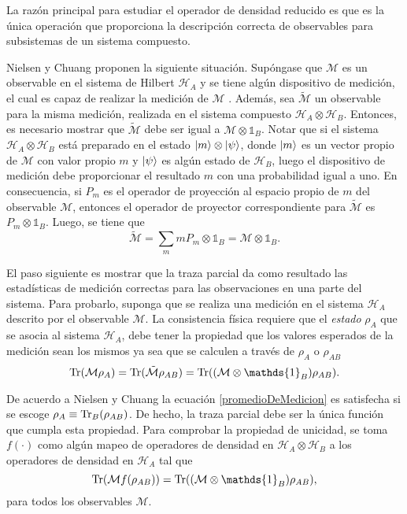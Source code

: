 La razón principal para estudiar el operador de densidad reducido es que es la única operación que proporciona la descripción correcta de observables para subsistemas de un sistema compuesto. 

Nielsen y Chuang {\cite{nielsen_chuang_2010}} proponen la siguiente situación. Supóngase que $\mathcal{M}$ es un observable en el sistema de Hilbert $\mathcal{H}_A$ y se tiene algún dispositivo de medición, el cual es capaz de realizar la medición de $\mathcal{M}$ . Además, sea $\tilde{\mathcal{M}}$ un observable para la
misma medición, realizada en el sistema compuesto $\mathcal{H}_A\otimes
\mathcal{H}_B$. Entonces, es necesario mostrar que $\tilde{\mathcal{M}}$ debe
ser igual a $\mathcal{M}\otimes \mathds{1}_B$. Notar que si el sistema
$\mathcal{H}_A\otimes \mathcal{H}_B$ está preparado en el estado $|m \rangle
\otimes|\psi\rangle $, donde $|m\rangle $ es un vector propio de $\mathcal{M}$ con
valor propio $m$ y $|\psi\rangle$ es algún estado de $\mathcal{H}_B$, luego el
dispositivo de medición debe proporcionar  el resultado $m$ con una probabilidad igual a uno.  En consecuencia, si $P_m$ es el operador de proyección al
espacio propio de $m$ del observable $\mathcal{M}$, entonces el operador de
proyector correspondiente para $\tilde{\mathcal{M}}$ es $P_m\otimes
\mathds{1}_B$. Luego, se tiene que \[\mathcal{\tilde{M}}=\sum_m mP_m\otimes
\mathds{1}_B=\mathcal{M}\otimes \mathds{1}_B.\]

El paso siguiente es mostrar que la traza parcial da como resultado las estadísticas de medición correctas para
las observaciones en una parte del sistema. Para probarlo, suponga que se realiza
una medición en el sistema $\mathcal{H}_A$ descrito por el observable
$\mathcal{M}$. La consistencia física requiere que el \textit{estado} $\rho_A$ que se asocia al sistema $\mathcal{H}_A$, debe tener la propiedad que los valores esperados de la medición sean los mismos ya sea que se calculen a través de $\rho_A$ o $\rho_{AB}$ {\cite{nielsen_chuang_2010}}
\begin{equation}\label{promedioDeMedicion}\tr(\mathcal{M}\rho_A)=\tr(\mathcal{\tilde{M}}\rho_{AB})=\tr((\mathcal{{M}}\otimes
\mathds{1}_B)\rho_{AB}).\end{equation} 

De acuerdo a Nielsen y Chuang {\cite{nielsen_chuang_2010}} la ecuación
{\ref{promedioDeMedicion}} es satisfecha si se escoge $\rho_A\equiv {\rm Tr}_B(\rho
_{AB})$. De hecho, la traza parcial debe ser la única función que cumpla esta
propiedad. Para comprobar la propiedad de unicidad, se toma  $f(\cdot)$ como
algún mapeo de operadores de densidad en $\mathcal{H}_A\otimes \mathcal{H}_B$ a
los operadores de densidad en $\mathcal{H}_A$ tal que \[\tr(\mathcal{M}
f(\rho_{AB} )) = \tr((\mathcal{M}\otimes \mathds{1}_B )\rho_{AB} ),\] para
todos los observables $\mathcal{M}$. 

